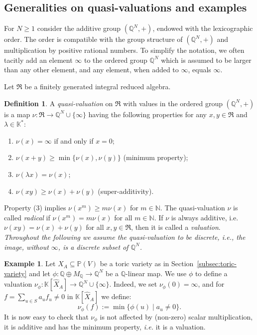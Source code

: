 \documentclass[12pt, a4article]{amsart}   	%
\numberwithin{equation}{section}
\theoremstyle{plain}
\theoremstyle{definition}
\newtheorem{example}[theorem]{Example}
\newtheorem{definition}[theorem]{Definition}
\begin{document}
\subsection{Generalities on quasi-valuations and examples}\label{some:generalities:quasi:valuation}


For $N\ge 1$ consider the additive group $(\mathbb Q^N,+)$, endowed with the lexicographic order. The order is compatible with the group structure of $(\mathbb Q^N,+)$ and multiplication by positive rational numbers. To simplify the notation, we often tacitly add an element $\infty$ to the ordered group $\mathbb{Q}^N$ which is assumed to be larger than any other element, and any element, when added to $\infty$, equals $\infty$.

Let $\mathfrak R$ be a finitely generated integral reduced algebra.

\begin{definition}\label{defn:quasi:valuation}
A \emph{quasi-valuation} on $\mathfrak R$ with values in the ordered group $(\mathbb Q^N,+)$ is a map $\nu: \mathfrak R\to \mathbb Q^N\cup\{\infty\}$ having the following properties for any $x,y\in \mathfrak R$ and $\lambda\in\mathbb{K}^*$:
\begin{enumerate}
\item[(0)] $\nu(x) = \infty$ if and only if $x=0$;
\item[(1)] $\nu(x + y) \ge \min\{\nu(x), \nu(y)\}$ (minimum property);
\item[(2)]  $\nu(\lambda x) = \nu(x)$;
\item[(3)]  $\nu(xy) \ge \nu(x) + \nu(y)$ (super-additivity).
\end{enumerate}
\end{definition}

Property (3) implies $\nu(x^m)\ge m\nu(x)$ for $m\in \mathbb N$. The quasi-valuation $\nu$ is called \emph{radical} if $\nu(x^m)=m\nu(x)$ for all $m\in\mathbb N$.  If $\nu$ is always additive, i.e.  $\nu(xy)= \nu(x) + \nu(y)$ for all $x,y \in \mathfrak R$, then it is called a \emph{valuation}.
\vskip 5pt
\textit{Throughout the following we assume the quasi-valuation to be \emph{discrete}, \textit{i.e.}, the image, without $\infty$, is a discrete subset of $\mathbb Q^N$. }
\vskip 5pt
\begin{example}\label{example:homomorphism:valuation1}
Let $X_A\subseteq \mathbb P(V)$ be a toric variety as in Section~\ref{subsec:toric-variety} and let
$\phi: \mathbb Q\oplus M_\mathbb Q\rightarrow \mathbb Q^N$ be a $\mathbb{Q}$-linear map. We use $\phi$ to define a valuation $\nu_{\phi}:\mathbb K[\hat X_A]\to\mathbb{Q}^N\cup\{\infty\}$. Indeed, we set $\nu_\phi(0)=\infty$, and for $f=\sum_{u\in S} a_{u}f_{u}\neq 0$ in $\mathbb K[\hat X_A]$ we define:
$$\nu_\phi(f):=\min\{\phi(u)\mid a_{u}\not=0\}.$$
It is now easy to check that $\nu_\phi$ is not affected by (non-zero) scalar multiplication, 
it is additive and has the minimum property, \emph{i.e.} it is a valuation.
\end{example}
\end{document}
